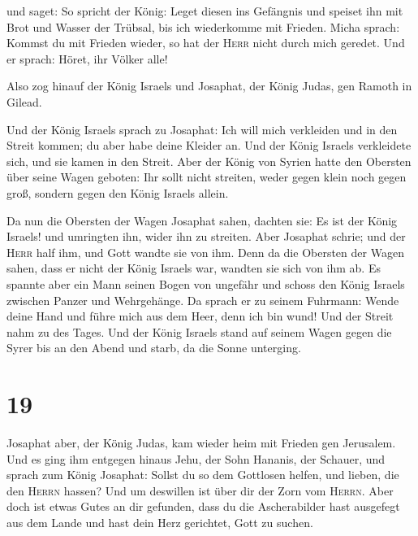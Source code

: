  und saget: So spricht der König: Leget diesen ins
Gefängnis und speiset ihn mit Brot und Wasser der Trübsal, bis ich
wiederkomme mit Frieden.  Micha sprach: Kommst du mit
Frieden wieder, so hat der \textsc{Herr} nicht durch mich geredet. Und
er sprach: Höret, ihr Völker alle!

 Also zog hinauf der König Israels und Josaphat, der
König Judas, gen Ramoth in Gilead.

 Und der König Israels sprach zu Josaphat: Ich will mich
verkleiden und in den Streit kommen; du aber habe deine Kleider an. Und
der König Israels verkleidete sich, und sie kamen in den Streit.
 Aber der König von Syrien hatte den Obersten über seine
Wagen geboten: Ihr sollt nicht streiten, weder gegen klein noch gegen
groß, sondern gegen den König Israels allein.

 Da nun die Obersten der Wagen Josaphat sahen, dachten
sie: Es ist der König Israels! und umringten ihn, wider ihn zu streiten.
Aber Josaphat schrie; und der \textsc{Herr} half ihm, und Gott wandte
sie von ihm.  Denn da die Obersten der Wagen sahen, dass
er nicht der König Israels war, wandten sie sich von ihm ab.
 Es spannte aber ein Mann seinen Bogen von ungefähr und
schoss den König Israels zwischen Panzer und Wehrgehänge. Da sprach er
zu seinem Fuhrmann: Wende deine Hand und führe mich aus dem Heer, denn
ich bin wund!  Und der Streit nahm zu des Tages. Und der
König Israels stand auf seinem Wagen gegen die Syrer bis an den Abend
und starb, da die Sonne unterging.

\hypertarget{section-18}{%
\section{19}\label{section-18}}

 Josaphat aber, der König Judas, kam wieder heim mit
Frieden gen Jerusalem.  Und es ging ihm entgegen hinaus
Jehu, der Sohn Hananis, der Schauer, und sprach zum König Josaphat:
Sollst du so dem Gottlosen helfen, und lieben, die den \textsc{Herrn}
hassen? Und um deswillen ist über dir der Zorn vom \textsc{Herrn}.
 Aber doch ist etwas Gutes an dir gefunden, dass du die
Ascherabilder hast ausgefegt aus dem Lande und hast dein Herz gerichtet,
Gott zu suchen.

